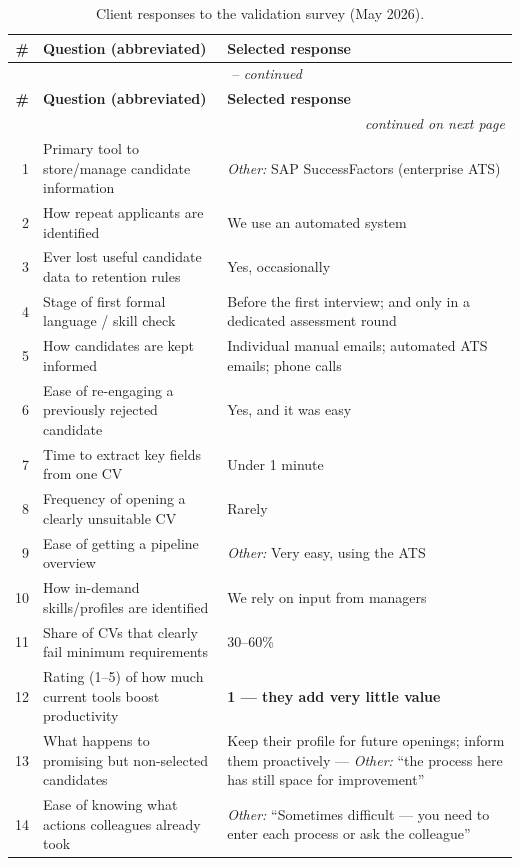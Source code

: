 \begin{longtable}{@{}r p{6.0cm} p{6.0cm}@{}}
	\caption{Client responses to the validation survey (May 2026).}
	\label{tab:survey-responses} \\
	\toprule
	\textbf{\#} & \textbf{Question (abbreviated)} & \textbf{Selected response} \\
	\midrule
	\endfirsthead
	\multicolumn{3}{c}{\tablename\ \thetable\ -- \textit{continued}} \\
	\toprule
	\textbf{\#} & \textbf{Question (abbreviated)} & \textbf{Selected response} \\
	\midrule
	\endhead
	\midrule \multicolumn{3}{r}{\textit{continued on next page}} \\
	\endfoot
	\bottomrule
	\endlastfoot

	1  & Primary tool to store/manage candidate information & \textit{Other:} SAP SuccessFactors (enterprise ATS) \\
	2  & How repeat applicants are identified & We use an automated system \\
	3  & Ever lost useful candidate data to retention rules & Yes, occasionally \\
	4  & Stage of first formal language / skill check & Before the first interview; and only in a dedicated assessment round \\
	5  & How candidates are kept informed & Individual manual emails; automated ATS emails; phone calls \\
	6  & Ease of re-engaging a previously rejected candidate & Yes, and it was easy \\
	7  & Time to extract key fields from one CV & Under 1 minute \\
	8  & Frequency of opening a clearly unsuitable CV & Rarely \\
	9  & Ease of getting a pipeline overview & \textit{Other:} Very easy, using the ATS \\
	10 & How in-demand skills/profiles are identified & We rely on input from managers \\
	11 & Share of CVs that clearly fail minimum requirements & 30--60\% \\
	12 & Rating (1--5) of how much current tools boost productivity & \textbf{1 --- they add very little value} \\
	13 & What happens to promising but non-selected candidates & Keep their profile for future openings; inform them proactively --- \textit{Other:} ``the process here has still space for improvement'' \\
	14 & Ease of knowing what actions colleagues already took & \textit{Other:} ``Sometimes difficult --- you need to enter each process or ask the colleague'' \\

\end{longtable}

